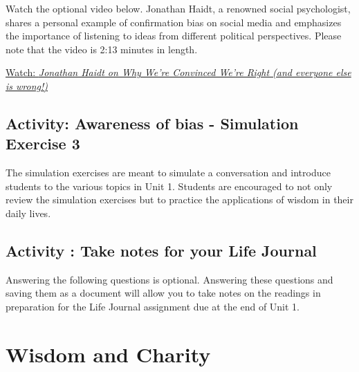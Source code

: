 \documentclass[
]{book}
\begin{document}
\begin{reflect}
Watch the optional video below. Jonathan Haidt, a renowned social psychologist, shares a personal example of confirmation bias on social media and emphasizes the importance of listening to ideas from different political perspectives. Please note that the video is 2:13 minutes in length.

\href{https://www.youtube.com/watch?v=XO0AVyF6EVg}{Watch: \emph{Jonathan Haidt on Why We're Convinced We're Right (and everyone else is wrong!)}}
\end{reflect}

\hypertarget{activity-awareness-of-bias---simulation-exercise-3}{%
\subsection*{Activity: Awareness of bias - Simulation Exercise 3}\label{activity-awareness-of-bias---simulation-exercise-3}}

\begin{reflect}
The simulation exercises are meant to simulate a conversation and introduce students to the various topics in Unit 1. Students are encouraged to not only review the simulation exercises but to practice the applications of wisdom in their daily lives.
\end{reflect}

\hypertarget{activity-take-notes-for-your-life-journal-3}{%
\subsection*{Activity : Take notes for your Life Journal}\label{activity-take-notes-for-your-life-journal-3}}

\begin{reflect}
Answering the following questions is optional. Answering these questions and saving them as a document will allow you to take notes on the readings in preparation for the Life Journal assignment due at the end of Unit 1.
\end{reflect}

\hypertarget{wisdom-and-charity}{%
\section{Wisdom and Charity}\label{wisdom-and-charity}}
\end{document}
